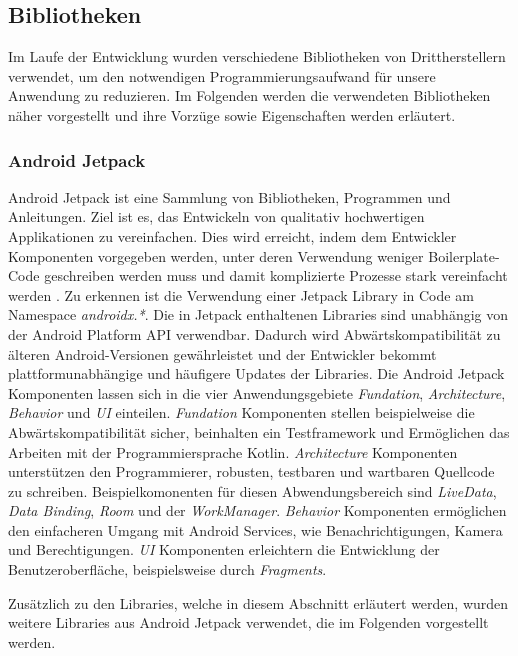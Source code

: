 \documentclass[a4paper]{article}
\begin{document}
\subsection{Bibliotheken}
\label{subsec:technologies:bibs}
Im Laufe der Entwicklung wurden verschiedene Bibliotheken von Drittherstellern verwendet, um den notwendigen Programmierungsaufwand für unsere Anwendung zu reduzieren.
Im Folgenden werden die verwendeten Bibliotheken näher vorgestellt und ihre Vorzüge sowie Eigenschaften werden erläutert.


\subsubsection{Android Jetpack}
\label{subsubsec:technologies:bibs:jetpack}
Android Jetpack ist eine Sammlung von Bibliotheken, Programmen und Anleitungen. Ziel ist es, das Entwickeln von qualitativ hochwertigen Applikationen zu vereinfachen. Dies wird erreicht, indem dem Entwickler Komponenten vorgegeben werden, unter deren Verwendung weniger Boilerplate-Code geschreiben werden muss und damit komplizierte Prozesse stark vereinfacht werden \autocite{android_jetpack}. Zu erkennen ist die Verwendung einer Jetpack Library in Code am Namespace \textit{androidx.*}. Die in Jetpack enthaltenen Libraries sind unabhängig von der Android Platform API verwendbar. Dadurch wird Abwärtskompatibilität zu älteren Android-Versionen gewährleistet und der Entwickler bekommt plattformunabhängige und häufigere Updates der Libraries. Die Android Jetpack Komponenten lassen sich in die vier Anwendungsgebiete \textit{Fundation}, \textit{Architecture}, \textit{Behavior} und \textit{UI} einteilen. \textit{Fundation} Komponenten stellen beispielweise die Abwärtskompatibilität sicher, beinhalten ein Testframework und Ermöglichen das Arbeiten mit der Programmiersprache Kotlin. \textit{Architecture} Komponenten unterstützen den Programmierer, robusten, testbaren und wartbaren Quellcode zu schreiben. Beispielkomonenten für diesen Abwendungsbereich sind \textit{LiveData}, \textit{Data Binding}, \textit{Room} und der \textit{WorkManager}. \textit{Behavior} Komponenten ermöglichen den einfacheren Umgang mit Android Services, wie Benachrichtigungen, Kamera und Berechtigungen. \textit{UI} Komponenten erleichtern die Entwicklung der Benutzeroberfläche, beispielsweise durch \textit{Fragments}.

Zusätzlich zu den Libraries, welche in diesem Abschnitt erläutert werden, wurden weitere Libraries aus Android Jetpack verwendet, die im Folgenden vorgestellt werden.
\end{document}
